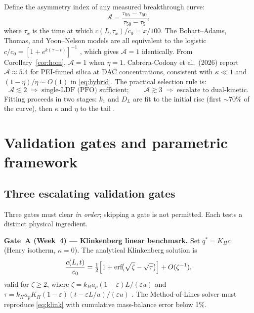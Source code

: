 \documentclass[a4paper]{amsart}
\theoremstyle{definition}
\begin{document}
Define the asymmetry index of any measured breakthrough curve:
\begin{equation}
  \mathcal{A} = \frac{\tau_{95}-\tau_{50}}{\tau_{50}-\tau_5},
  \label{eq:asym}
\end{equation}
where $\tau_x$ is the time at which $c(L,\tau_x)/c_0=x/100$.
The Bohart--Adams, Thomas, and Yoon--Nelson models are all equivalent to
the logistic $c/c_0=[1+e^{k(\tau-t)}]^{-1}$ \cite{Hu2024}, which gives
$\mathcal{A}=1$ identically.
From Corollary~\ref{cor:hom}, $\mathcal{A}=1$ when $\eta=1$.
Cabrera-Codony et al.\ (2026) report $\mathcal{A}\approx5.4$ for PEI-fumed
silica at DAC concentrations, consistent with $\kappa\ll1$ and
$(1-\eta)/\eta\sim O(1)$ in \eqref{eq:hybrid}.
The practical selection rule is:
\begin{equation}
  \mathcal{A}\lesssim2 \;\Rightarrow\; \text{single-LDF (PFO) sufficient};\qquad
  \mathcal{A}\gtrsim3 \;\Rightarrow\; \text{escalate to dual-kinetic.}
  \label{eq:rule}
\end{equation}
Fitting proceeds in two stages: $k_1$ and $D_L$ are fit to the initial rise
(first $\sim70\%$ of the curve), then $\kappa$ and $\eta$ to the tail \cite{Stampi2024}.

\section{Validation gates and parametric framework}
\label{sec:gates}

\subsection{Three escalating validation gates}

Three gates must clear \emph{in order}; skipping a gate is not permitted.
Each tests a distinct physical ingredient.

\medskip
\textbf{Gate~A (Week~4) --- Klinkenberg linear benchmark.}
Set $q^*=K_H c$ (Henry isotherm, $\kappa=0$).
The analytical Klinkenberg solution \cite{Hu2024} is
\begin{equation}
  \frac{c(L,t)}{c_0}
  = \tfrac{1}{2}\Bigl[1+\mathrm{erf}\!\bigl(\sqrt{\zeta}-\sqrt{\tau}\bigr)\Bigr]
  + O(\zeta^{-1}),
  \label{eq:klink}
\end{equation}
valid for $\zeta\geq2$, where
$\zeta=k_H a_p(1-\varepsilon)L/(\varepsilon u)$ and
$\tau=k_H a_p K_H(1-\varepsilon)(t-\varepsilon L/u)/(\varepsilon u)$
\cite{Hu2024}.
The Method-of-Lines solver must reproduce \eqref{eq:klink} with cumulative
mass-balance error below 1\%.
\end{document}

